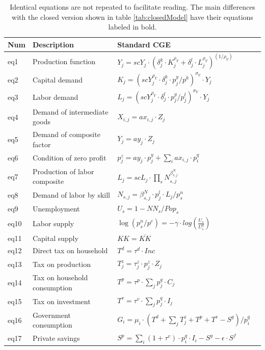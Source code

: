 


\begin{table}[!h]
	\centering
	\caption[Comparative equations of IO and CGE models.]{Identical equations are not repeated to facilitate reading. The main differences with the closed version shown in table \ref{tab:closedModel} have their equations labeled in bold.}
	\label{tab:fullModel}
	\begin{tabular}{llll}
		\toprule
		Num & Description & Standard CGE  \\
		\midrule
		eq1 & Production function & $Y_j    = scY_j \cdot  ( \delta^k_j \cdot K_j^{\rho_Y} + \delta^l_j \cdot L_j^{\rho_Y} )^(1/\rho_Y)$ \\
		eq2 & Capital demand & $ K_j = (scY_j^{\rho_Y} \cdot  \delta^k_j \cdot  p^y_j / p^k )^{\sigma_Y} \cdot  Y_j $ \\
		eq3 & Labor demand  & $L_j = (scY_j^{\rho_Y} \cdot \delta^l_j \cdot  p^y_j / p^l_j )^{\sigma_Y} \cdot Y_j $ \\	
		eq4 & Demand of intermediate goods & $X_{i,j}  = ax_{i,j} \cdot Z_j$ \\
		eq5 & Demand of composite factor & $Y_j    = ay_j \cdot Z_j$ \\
		eq6 & Condition of zero profit & $p^z_j   = ay_j \cdot p^y_j + \sum_i ax_{i,j} \cdot p^q_i$ \\
		eq7 & Production of labor composite & $L_j    = scL_j \cdot  \prod_s N_{s,j}^{\beta^N_{s,j}}$  \\
		eq8 & Demand of labor by skill & $N_{s,j}  = \beta^N_{s,j} \cdot p^l_j \cdot  L_j / p^n_s$ \\
		eq9 & Unemployment & $ U_s =  1 - NN_s/Pop_s $\\
		eq10 & Labor supply & $\log( p^n_s / p^c ) = - \gamma \cdot  log(\frac{U_s}{U^0_s}) $  \\
		eq11 & Capital supply & $KK = \overline{KK} $  \\
		\midrule
		eq12 & Direct tax on household & $T^d = \tau^d \cdot Inc $\\
		eq13 & Tax on production & $T^z_j = \tau^z_j \cdot p^z_j \cdot Z_j$ \\
		eq14 & Tax on household consumption & $T^p = \tau^p \cdot \sum_j  p^q_j \cdot C_j $ \\
		eq15 & Tax on investment & $T^v = \tau^v \cdot \sum_j p^q_j\cdot I_j $ \\
		eq16 & Government consumption & $G_i = \mu_i \cdot ( T^d + \sum_j T^z_j + T^p + T^v - S^g ) / p^q_i$ \\
		\midrule
		eq17 & Private savings & $S^p = \sum_i (1+\tau^v) \cdot p^q_i \cdot I_i - S^g - \epsilon \cdot S^f$ \\

\end{tabular}
\end{table}

